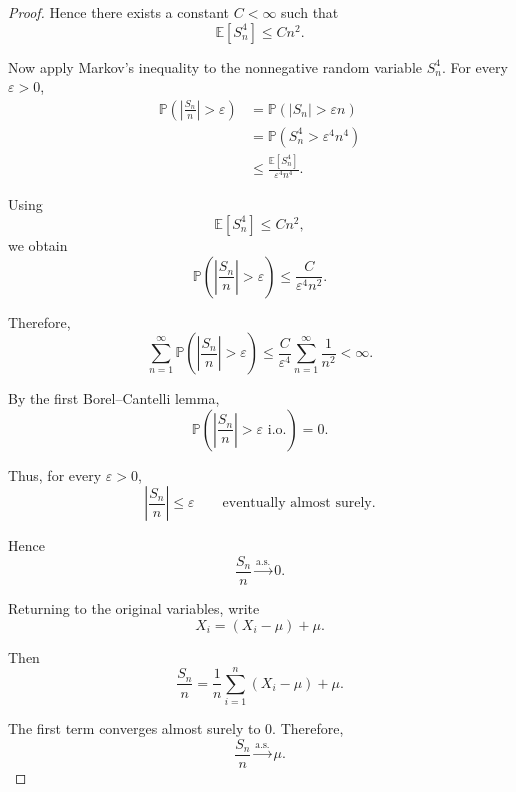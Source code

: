 \begin{proof}
Hence there exists a constant $C<\infty$ such that
\[
\boxed{
\mathbb{E}[S_n^4]\leq Cn^2.
}
\]

\medskip

Now apply Markov's inequality to the nonnegative random variable
$S_n^4$. For every $\varepsilon>0$,
\[
\begin{aligned}
\mathbb{P}
\left(
\left|
\frac{S_n}{n}
\right|>\varepsilon
\right)
&=
\mathbb{P}
\left(
|S_n|>\varepsilon n
\right)\\
&=
\mathbb{P}
\left(
S_n^4>\varepsilon^4n^4
\right)\\
&\leq
\frac{\mathbb{E}[S_n^4]}
{\varepsilon^4n^4}.
\end{aligned}
\]

Using
\[
\mathbb{E}[S_n^4]\leq Cn^2,
\]
we obtain
\[
\mathbb{P}
\left(
\left|
\frac{S_n}{n}
\right|>\varepsilon
\right)
\leq
\frac{C}{\varepsilon^4n^2}.
\]

Therefore,
\[
\sum_{n=1}^{\infty}
\mathbb{P}
\left(
\left|
\frac{S_n}{n}
\right|>\varepsilon
\right)
\leq
\frac{C}{\varepsilon^4}
\sum_{n=1}^{\infty}\frac1{n^2}
<\infty.
\]

By the first Borel--Cantelli lemma,
\[
\mathbb{P}
\left(
\left|
\frac{S_n}{n}
\right|>\varepsilon
\text{ i.o.}
\right)
=0.
\]

Thus, for every $\varepsilon>0$,
\[
\left|
\frac{S_n}{n}
\right|
\leq\varepsilon
\qquad
\text{eventually almost surely}.
\]

Hence
\[
\frac{S_n}{n}
\xrightarrow{\mathrm{a.s.}}
0.
\]

Returning to the original variables, write
\[
X_i=(X_i-\mu)+\mu.
\]

Then
\[
\frac{S_n}{n}
=
\frac1n
\sum_{i=1}^{n}(X_i-\mu)
+\mu.
\]

The first term converges almost surely to $0$. Therefore,
\[
\boxed{
\frac{S_n}{n}
\xrightarrow{\mathrm{a.s.}}
\mu.
}
\]

\end{proof}





\lectureend



